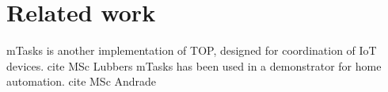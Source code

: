 
\section{Related work}

mTasks is another implementation of TOP, designed for coordination of IoT devices. \alert{cite MSc Lubbers}
mTasks has been used in a demonstrator for home automation. \alert{cite MSc Andrade}

